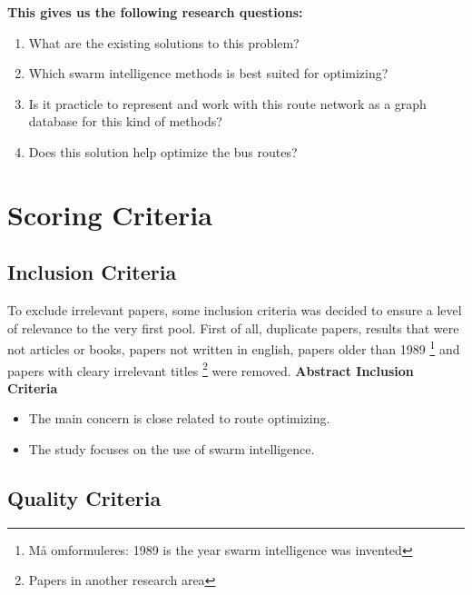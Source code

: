 \textbf{This gives us the following research questions:}
\begin{enumerate}
\item What are the existing solutions to this problem?
\item Which swarm intelligence methods is best suited for optimizing? 
\item Is it practicle to represent and work with this route network as a graph database for this kind of methods?
\item Does this solution help optimize the bus routes? 
\end{enumerate}

\section{Scoring Criteria}
\subsection{Inclusion Criteria}
To exclude irrelevant papers, some inclusion criteria was decided to ensure a level of relevance to the very first pool. First of all, duplicate papers, results that were not articles or books, papers not written in english, papers older than 1989 \footnote{ Må omformuleres: 1989 is the year swarm intelligence was invented} and papers with cleary irrelevant titles \footnote{ Papers in another research area} were removed. 
\newline
\newline
\textbf{Abstract Inclusion Criteria}
\begin{itemize}
\item The main concern is close related to route optimizing. 
\item The study focuses on the use of swarm intelligence.
\end{itemize}

\subsection{Quality Criteria}
